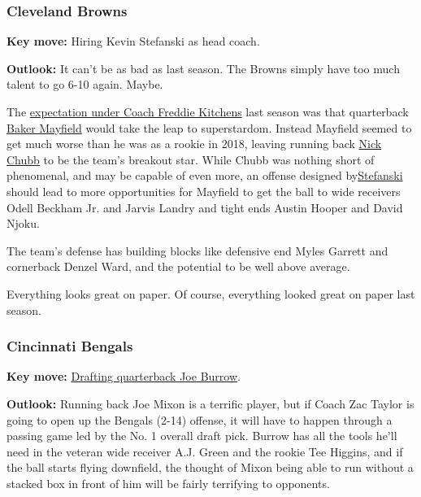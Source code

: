 \hypertarget{cleveland-browns}{%
\subsubsection{\texorpdfstring{\textbf{Cleveland
Browns}}{Cleveland Browns}}\label{cleveland-browns}}

\textbf{Key move:} Hiring Kevin Stefanski as head coach.

\textbf{Outlook:} It can't be as bad as last season. The Browns simply
have too much talent to go 6-10 again. Maybe.

The
\href{https://www.nytimes3xbfgragh.onion/2019/08/10/sports/football/baker-mayfield-odell-beckham-browns.html}{expectation
under Coach Freddie Kitchens} last season was that quarterback
\href{https://www.pro-football-reference.com/players/M/MayfBa00.htm}{Baker
Mayfield} would take the leap to superstardom. Instead Mayfield seemed
to get much worse than he was as a rookie in 2018, leaving running back
\href{https://www.pro-football-reference.com/players/C/ChubNi00.htm}{Nick
Chubb} to be the team's breakout star. While Chubb was nothing short of
phenomenal, and may be capable of even more, an offense designed
by\href{https://www.clevelandbrowns.com/team/coaches-roster/kevin-stefanski}{Stefanski}
should lead to more opportunities for Mayfield to get the ball to wide
receivers Odell Beckham Jr. and Jarvis Landry and tight ends Austin
Hooper and David Njoku.

The team's defense has building blocks like defensive end Myles Garrett
and cornerback Denzel Ward, and the potential to be well above average.

Everything looks great on paper. Of course, everything looked great on
paper last season.

\hypertarget{cincinnati-bengals}{%
\subsubsection{\texorpdfstring{\textbf{Cincinnati
Bengals}}{Cincinnati Bengals}}\label{cincinnati-bengals}}

\textbf{Key move:}
\href{https://www.nytimes3xbfgragh.onion/article/joe-burrow-nfl-draft.html}{Drafting
quarterback Joe Burrow}.

\textbf{Outlook:} Running back Joe Mixon is a terrific player, but if
Coach Zac Taylor is going to open up the Bengals (2-14) offense, it will
have to happen through a passing game led by the No. 1 overall draft
pick. Burrow has all the tools he'll need in the veteran wide receiver
A.J. Green and the rookie Tee Higgins, and if the ball starts flying
downfield, the thought of Mixon being able to run without a stacked box
in front of him will be fairly terrifying to opponents.

